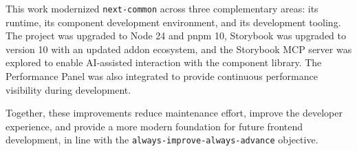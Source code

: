 This work modernized \texttt{next-common} across three complementary areas: its runtime, its component development environment, and its development tooling. The project was upgraded to Node 24 and pnpm 10, Storybook was upgraded to version 10 with an updated addon ecosystem, and the Storybook MCP server was explored to enable AI-assisted interaction with the component library. The Performance Panel was also integrated to provide continuous performance visibility during development.

Together, these improvements reduce maintenance effort, improve the developer experience, and provide a more modern foundation for future frontend development, in line with the \texttt{always-improve-always-advance} objective.

\clearpage
